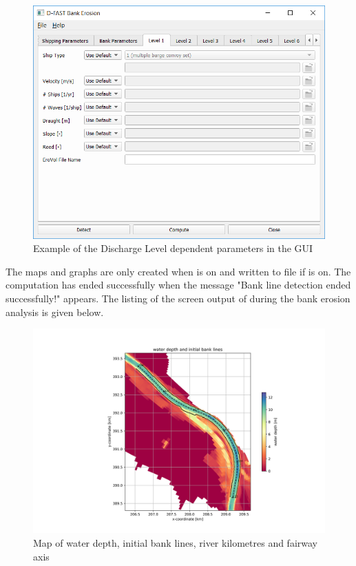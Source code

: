 \begin{figure}
\center
\includegraphics[width=\textwidth]{figures/gui6.png}
\caption{Example of the Discharge Level dependent parameters in the GUI}
\label{guiLevelX}
\end{figure}

The maps and graphs are only created when  is on and written to file if  is on.
The computation has ended successfully when the message "Bank line detection ended successfully!" appears.
The listing of the screen output of \dfastbe during the bank erosion analysis is given below.

\begin{figure}
\includegraphics[width=\textwidth]{figures/1_banklines.png}
\caption{Map of water depth, initial bank lines, river kilometres and fairway axis}
\label{Fig2.4}
\end{figure}

